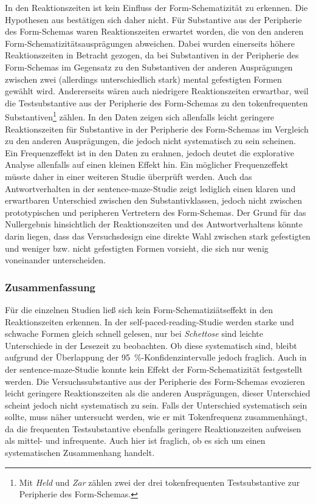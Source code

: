In den Reaktionszeiten ist kein Einfluss der Form-Schematizität zu erkennen. Die Hypothesen aus  bestätigen sich daher nicht. Für Substantive aus der Peripherie des Form-Schemas waren Reaktionszeiten erwartet worden, die von den anderen Form-Schematizitätsausprägungen abweichen. Dabei wurden einerseits höhere Reaktionszeiten in Betracht gezogen, da bei Substantiven in der Peripherie des Form-Schemas im Gegensatz zu den Substantiven der anderen Ausprägungen zwischen zwei (allerdings unterschiedlich stark) mental gefestigten Formen gewählt wird. Andererseits wären auch niedrigere Re\-ak\-tions\-zei\-ten erwartbar, weil die Testsubstantive aus der Peripherie des Form-Schemas zu den tokenfrequenten Substantiven\footnote{Mit \textit{Held} und \textit{Zar} zählen zwei der drei tokenfrequenten Testsubstantive zur Peripherie des Form-Schemas.} zählen. In den Daten zeigen sich allenfalls leicht geringere Reaktionszeiten für Substantive in der Peripherie des Form-Schemas im Vergleich zu den anderen Ausprägungen, die jedoch nicht systematisch zu sein scheinen. Ein Frequenzeffekt ist in den Daten zu erahnen, jedoch deutet die explorative Analyse allenfalls auf einen kleinen Effekt hin. Ein möglicher Frequenzeffekt müsste daher in einer weiteren Studie überprüft werden. Auch das Antwortverhalten in der sentence-maze-Studie zeigt lediglich einen klaren und erwartbaren Unterschied zwischen den Substantivklassen, jedoch nicht zwischen prototypischen und peripheren Vertretern des Form-Schemas. Der Grund für das Nullergebnis hinsichtlich der Reaktionszeiten und des Antwortverhaltens könnte darin liegen, dass das Versuchsdesign eine direkte Wahl zwischen stark gefestigten und weniger bzw. nicht gefestigten Formen vorsieht, die sich nur wenig voneinander unterscheiden. 

\subsubsection{Zusammenfassung}

Für die einzelnen Studien ließ sich kein Form-Schematiziätseffekt in den Reaktionszeiten erkennen. In der self-paced-reading-Studie werden starke und schwache Formen gleich schnell gelesen, nur bei \textit{Schettose} sind leichte Unterschiede in der Lesezeit zu beobachten. Ob diese systematisch sind, bleibt aufgrund der Überlappung der 95~\%-Konfidenzintervalle jedoch fraglich. Auch in der sentence-maze-Studie konnte kein Effekt der Form-Schematizität festgestellt werden. Die Versuchssubstantive aus der Peripherie des Form-Schemas evozieren leicht geringere Reaktionszeiten als die anderen Ausprägungen, dieser Unterschied scheint jedoch nicht systematisch zu sein. Falls der Unterschied systematisch sein sollte, muss näher untersucht werden, wie er mit Tokenfrequenz zusammenhängt, da die frequenten Testsubstantive ebenfalls geringere Reaktionszeiten aufweisen als mittel- und infrequente. Auch hier ist fraglich, ob es sich um einen systematischen Zusammenhang handelt. 


